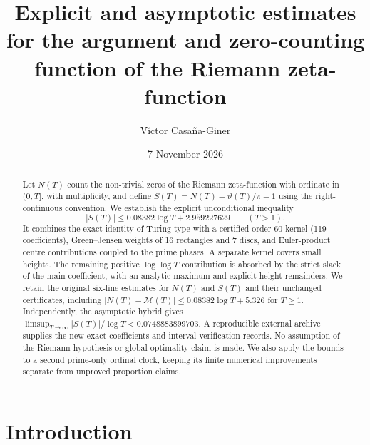 \documentclass[11pt,reqno]{amsart}
\title[Explicit bounds for $S(T)$ and $N(T)$]{Explicit and asymptotic estimates for the argument and zero-counting function of the Riemann zeta-function}
\author{V\'ictor Casa\~na-Giner}
\date{7 November 2026}
\numberwithin{equation}{section}
\theoremstyle{definition}
\theoremstyle{remark}
\newcommand{\GreenC}{2.959227629}
\newcommand{\GreenA}{0.08382}
\begin{document}
\begin{abstract}
Let $N(T)$ count the non-trivial zeros of the Riemann zeta-function
with ordinate in $(0,T]$, with multiplicity, and define
$S(T)=N(T)-\vartheta(T)/\pi-1$ using the right-continuous convention.
We establish the explicit unconditional inequality
\[
|S(T)|\le\GreenA\log T+\GreenC\qquad(T>1).
\]
It combines the exact identity of Turing type with a certified order-$60$
kernel (119 coefficients), Green--Jensen weights of 16 rectangles and
7 discs, and Euler-product centre contributions coupled to the prime
phases. A separate kernel covers small heights. The remaining positive
$\log\log T$ contribution is absorbed by the strict slack of the main
coefficient, with an analytic maximum and explicit height remainders.
We retain the original six-line estimates for $N(T)$ and $S(T)$ and
their unchanged certificates, including
$|N(T)-\mathcal M(T)|\le0.08382\log T+5.326$ for $T\ge1$.
Independently, the asymptotic hybrid gives
$\limsup_{T\to\infty}|S(T)|/\log T<0.0748883899703$.
A reproducible external archive supplies the new exact coefficients
and interval-verification records. No assumption of the Riemann
hypothesis or global optimality claim is made. We also apply the
bounds to a second prime-only ordinal clock, keeping its finite
numerical improvements separate from unproved proportion claims.
\end{abstract}

\maketitle
\tableofcontents

\section{Introduction}\label{sec:intro}
\end{document}
